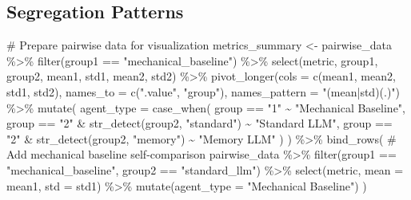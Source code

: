 \documentclass[
  11pt,
]{article}
\newenvironment{Shaded}{\begin{snugshade}}{\end{snugshade}}
\newcommand{\AttributeTok}[1]{\textcolor[rgb]{0.40,0.45,0.13}{#1}}
\newcommand{\CommentTok}[1]{\textcolor[rgb]{0.37,0.37,0.37}{#1}}
\newcommand{\FunctionTok}[1]{\textcolor[rgb]{0.28,0.35,0.67}{#1}}
\newcommand{\NormalTok}[1]{\textcolor[rgb]{0.00,0.23,0.31}{#1}}
\newcommand{\OtherTok}[1]{\textcolor[rgb]{0.00,0.23,0.31}{#1}}
\newcommand{\SpecialCharTok}[1]{\textcolor[rgb]{0.37,0.37,0.37}{#1}}
\newcommand{\StringTok}[1]{\textcolor[rgb]{0.13,0.47,0.30}{#1}}
\begin{document}
\subsection{Segregation Patterns}\label{segregation-patterns}

\begin{Shaded}
\begin{Highlighting}[]
\CommentTok{\# Prepare pairwise data for visualization}
\NormalTok{metrics\_summary }\OtherTok{\textless{}{-}}\NormalTok{ pairwise\_data }\SpecialCharTok{\%\textgreater{}\%}
  \FunctionTok{filter}\NormalTok{(group1 }\SpecialCharTok{==} \StringTok{"mechanical\_baseline"}\NormalTok{) }\SpecialCharTok{\%\textgreater{}\%}
  \FunctionTok{select}\NormalTok{(metric, group1, group2, mean1, std1, mean2, std2) }\SpecialCharTok{\%\textgreater{}\%}
  \FunctionTok{pivot\_longer}\NormalTok{(}\AttributeTok{cols =} \FunctionTok{c}\NormalTok{(mean1, mean2, std1, std2),}
               \AttributeTok{names\_to =} \FunctionTok{c}\NormalTok{(}\StringTok{".value"}\NormalTok{, }\StringTok{"group"}\NormalTok{),}
               \AttributeTok{names\_pattern =} \StringTok{"(mean|std)(.)"}\NormalTok{) }\SpecialCharTok{\%\textgreater{}\%}
  \FunctionTok{mutate}\NormalTok{(}
    \AttributeTok{agent\_type =} \FunctionTok{case\_when}\NormalTok{(}
\NormalTok{      group }\SpecialCharTok{==} \StringTok{"1"} \SpecialCharTok{\textasciitilde{}} \StringTok{"Mechanical Baseline"}\NormalTok{,}
\NormalTok{      group }\SpecialCharTok{==} \StringTok{"2"} \SpecialCharTok{\&} \FunctionTok{str\_detect}\NormalTok{(group2, }\StringTok{"standard"}\NormalTok{) }\SpecialCharTok{\textasciitilde{}} \StringTok{"Standard LLM"}\NormalTok{,}
\NormalTok{      group }\SpecialCharTok{==} \StringTok{"2"} \SpecialCharTok{\&} \FunctionTok{str\_detect}\NormalTok{(group2, }\StringTok{"memory"}\NormalTok{) }\SpecialCharTok{\textasciitilde{}} \StringTok{"Memory LLM"}
\NormalTok{    )}
\NormalTok{  ) }\SpecialCharTok{\%\textgreater{}\%}
  \FunctionTok{bind\_rows}\NormalTok{(}
    \CommentTok{\# Add mechanical baseline self{-}comparison}
\NormalTok{    pairwise\_data }\SpecialCharTok{\%\textgreater{}\%}
      \FunctionTok{filter}\NormalTok{(group1 }\SpecialCharTok{==} \StringTok{"mechanical\_baseline"}\NormalTok{, group2 }\SpecialCharTok{==} \StringTok{"standard\_llm"}\NormalTok{) }\SpecialCharTok{\%\textgreater{}\%}
      \FunctionTok{select}\NormalTok{(metric, }\AttributeTok{mean =}\NormalTok{ mean1, }\AttributeTok{std =}\NormalTok{ std1) }\SpecialCharTok{\%\textgreater{}\%}
      \FunctionTok{mutate}\NormalTok{(}\AttributeTok{agent\_type =} \StringTok{"Mechanical Baseline"}\NormalTok{)}
\NormalTok{  )}


\end{Highlighting}
\end{Shaded}
\end{document}

